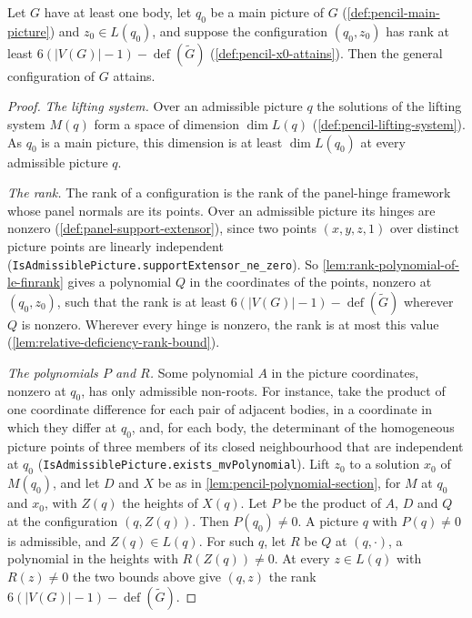 \begin{lemma}
  \label{lem:pencil-x0-one-witness}
  \leanok
  Let $G$ have at least one body, let $q_0$ be a main picture of $G$
  (\cref{def:pencil-main-picture}) and $z_0 \in L(q_0)$, and suppose the
  configuration $(q_0, z_0)$ has rank at least
  $6(|V(G)| - 1) - \operatorname{def}(\tilde G)$
  (\cref{def:pencil-x0-attains}). Then the general configuration of $G$
  attains.
\end{lemma}
\begin{proof}
  \leanok
  \emph{The lifting system.} Over an admissible picture $q$ the solutions
  of the lifting system $M(q)$ form a space of dimension $\dim L(q)$
  (\cref{def:pencil-lifting-system}). As $q_0$ is a main picture, this
  dimension is at least $\dim L(q_0)$ at every admissible picture $q$.

  \emph{The rank.} The rank of a configuration is the rank of the
  panel-hinge framework whose panel normals are its points. Over an
  admissible picture its hinges are nonzero
  (\cref{def:panel-support-extensor}), since two points $(x, y, z, 1)$
  over distinct picture points are linearly independent
  (\texttt{IsAdmissiblePicture.\allowbreak{}supportExtensor\_\allowbreak{}ne\_\allowbreak{}zero}).
  So
  \cref{lem:rank-polynomial-of-le-finrank} gives a polynomial $Q$ in the
  coordinates of the points, nonzero at $(q_0, z_0)$, such that the rank
  is at least $6(|V(G)| - 1) - \operatorname{def}(\tilde G)$ wherever $Q$
  is nonzero. Wherever every hinge is nonzero, the rank is at most this
  value (\cref{lem:relative-deficiency-rank-bound}).

  \emph{The polynomials $P$ and $R$.} Some polynomial $A$ in the picture
  coordinates, nonzero at $q_0$, has only admissible non-roots. For
  instance, take the product of one coordinate difference for each pair
  of adjacent bodies, in a coordinate in which they differ at $q_0$, and,
  for each body, the determinant of the homogeneous picture points of
  three members of its closed neighbourhood that are independent at
  $q_0$ (\texttt{IsAdmissiblePicture.\allowbreak{}exists\_\allowbreak{}mvPolynomial}).
  Lift $z_0$ to a solution $x_0$ of $M(q_0)$, and let $D$ and $X$
  be as in \cref{lem:pencil-polynomial-section}, for $M$ at $q_0$ and
  $x_0$, with $Z(q)$ the heights of $X(q)$. Let $P$ be the product
  of $A$, $D$ and $Q$ at the configuration $(q, Z(q))$. Then
  $P(q_0) \neq 0$. A picture $q$ with $P(q) \neq 0$ is admissible, and
  $Z(q) \in L(q)$. For such $q$, let $R$ be $Q$ at $(q, \cdot)$, a
  polynomial in the heights with $R(Z(q)) \neq 0$. At every
  $z \in L(q)$ with $R(z) \neq 0$ the two bounds above give $(q, z)$ the
  rank $6(|V(G)| - 1) - \operatorname{def}(\tilde G)$.
\end{proof}

